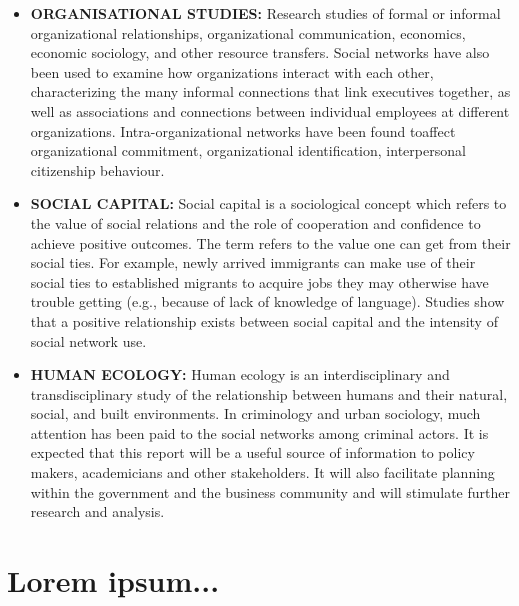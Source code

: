 \documentclass{book}
\begin{document}
\begin{itemize}
	\item \textbf{ORGANISATIONAL STUDIES:}
		Research studies of  formal or informal organizational relationships, organizational communication, economics, economic sociology, and other resource transfers. Social networks have also been used to examine how organizations interact with each other, characterizing the many informal connections that link executives together, as well as associations and connections between individual employees at different organizations. Intra-organizational networks have been found toaffect organizational commitment, organizational identification, interpersonal citizenship behaviour.
	\item \textbf{SOCIAL CAPITAL: }
		Social capital is a sociological concept which refers to the value of social relations and the role of cooperation and confidence to achieve positive outcomes. The term refers to the value one can get from their social ties. For example, newly arrived immigrants can make use of their social ties to established migrants to acquire jobs they may otherwise have trouble getting (e.g., because of lack of knowledge of language). Studies show that a positive relationship exists between social capital and the intensity of social network use.

	\item \textbf{HUMAN ECOLOGY: }
		Human ecology is an interdisciplinary and transdisciplinary study of the relationship between humans and their natural, social, and built environments. 
		In criminology and urban sociology, much attention has been paid to the social networks among criminal actors.
		It is expected that this report will be a useful source of information to policy makers, academicians and other stakeholders. It will also facilitate planning within the government and the business community and will stimulate further research and analysis.
\end{itemize}

\newpage
\thispagestyle{empty}


\tableofcontents
{}
\chapter{Lorem ipsum...}
\end{document}
